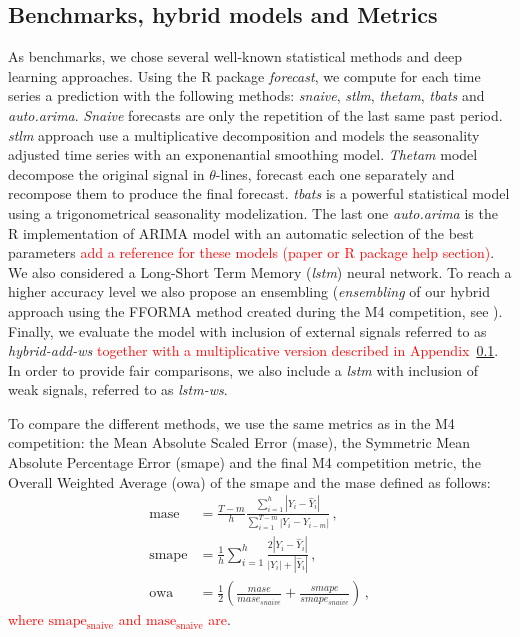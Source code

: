 \documentclass{article} %
\begin{document}
\subsection{Benchmarks, hybrid models and Metrics}

As benchmarks, we chose several well-known statistical methods and deep learning approaches. Using the R package {\em forecast}, we compute for each time series a prediction with the following methods: \textit{snaive}, \textit{stlm}, \textit{thetam}, \textit{tbats} and \textit{auto.arima}. \textit{Snaive} forecasts are only the repetition of the last same past period. \textit{stlm} approach use a multiplicative decomposition and models the seasonality adjusted time series with an exponenantial smoothing model. \textit{Thetam} model decompose the original signal in $\theta$-lines, forecast each one separately and recompose them to produce the final forecast. \textit{tbats} is a powerful statistical model using a trigonometrical seasonality modelization. The last one \textit{auto.arima} is the R implementation of ARIMA model with an automatic selection of the best parameters \textcolor{red}{add a reference for these models (paper or R package help section)}. We also considered a Long-Short Term Memory (\textit{lstm}) neural network. %
To reach a higher accuracy level we also propose an ensembling (\textit{ensembling} of our hybrid approach using the FFORMA method created during the M4 competition, see \citep{fforma}). 
Finally, we evaluate the model with  inclusion of external signals referred to as \textit{hybrid-add-ws} \textcolor{red}{together with a multiplicative version described in Appendix~\ref{}}. In order to provide fair comparisons, we also include a \textit{lstm} with inclusion of weak signals, referred to as \textit{lstm-ws}.


To compare the different methods, we use the same metrics as in the M4 competition: the Mean Absolute Scaled Error (mase), the Symmetric Mean Absolute Percentage Error (smape) and the final M4 competition metric, the Overall Weighted Average (owa) of the smape and the mase defined as follows:
\begin{align*}
\mathrm{mase} &= \frac{T-m}{h}\frac{\sum_{i=1}^h |Y_i - \hat{Y}_i| }{\sum_{i=1}^{T-m} |Y_i - Y_{i-m}|}\,,\\
\mathrm{smape} &= \frac{1}{h} \sum_{i=1}^h \frac{2|Y_i - \hat{Y}_i|}{|Y_i| + |\hat{Y}_i|}\,,\\
\mathrm{owa} &= \frac{1}{2}\left(\frac{mase}{mase_{snaive}} + \frac{smape}{smape_{snaive}}\right)\,,
\end{align*}
\textcolor{red}{where $\mathrm{smape_{snaive}}$ and $\mathrm{mase_{snaive}}$ are}.
\end{document}
